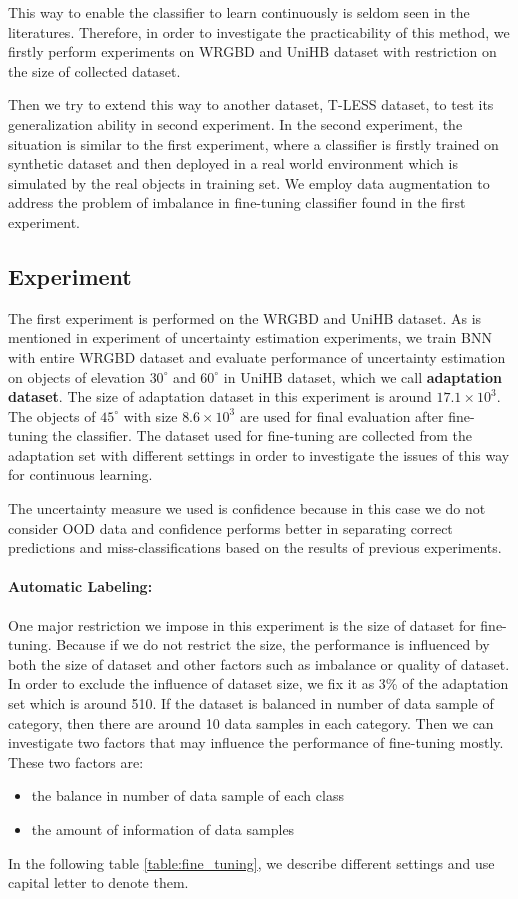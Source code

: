 This way to enable the classifier to learn continuously is seldom seen in the literatures. Therefore, in order to investigate the practicability of this method, we firstly perform experiments on WRGBD and UniHB dataset with restriction on the size of collected dataset. 

Then we try to extend this way to another dataset, T-LESS dataset, to test its generalization ability in second experiment. In the second experiment, the situation is similar to the first experiment, where a classifier is firstly trained on synthetic dataset and then deployed in a real world environment which is simulated by the real objects in training set.  We employ data augmentation to address the problem of imbalance in fine-tuning classifier found in the first experiment.
 
\subsection{Experiment }
The first experiment is performed on the WRGBD and UniHB dataset. As is mentioned in experiment  of uncertainty estimation experiments, we train BNN with entire WRGBD dataset and evaluate performance of uncertainty estimation on objects of elevation $30^{\circ}$ and $60^{\circ}$ in UniHB dataset, which we call \textbf{adaptation dataset}. The size of adaptation dataset in this experiment is around $17.1\times10^3$. The objects of $45^{\circ}$ with size $8.6\times10^3$ are used for final evaluation after fine-tuning the classifier. The dataset used for fine-tuning are collected from the adaptation set with different settings in order to investigate the issues of this way for continuous learning. 

The uncertainty measure we used is confidence because in this case we do not consider OOD data and confidence performs better in separating correct predictions and miss-classifications based on the results of previous experiments.

\paragraph{Automatic Labeling:}One major restriction we impose in this experiment is the size of dataset for fine-tuning. Because if we do not restrict the size, the performance is influenced by both the size of dataset and other factors such as imbalance or quality of dataset. In order to exclude the influence of dataset size, we fix it as 3\% of the adaptation set which is around 510. If the dataset is balanced in number of data sample of category, then there are around 10 data samples in each category. Then we can investigate two factors that may influence the performance of fine-tuning mostly. 
These two factors are:
\begin{itemize}
	\item the balance in number of data sample of each class 
	\item the amount of information of data samples
\end{itemize}
In the following table \ref{table:fine_tuning}, we describe different settings and use capital letter to denote them.

